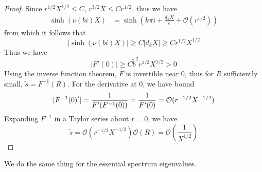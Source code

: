 \documentclass[thesis.tex]{subfiles}
\begin{document}
\begin{lemma}
\begin{proof}
Since $r^{1/2}X^{1/2} \leq C$, $r^{3/2}X \leq C r^{1/2}$, thus we have
\begin{align*} 
\sinh( \nu(bi)X) &= \sinh\left( k \pi i + \frac{d_k X}{c} + \mathcal{O}(r^{1/2}) \right)
\end{align*}
from which it follows that
\[
|\sinh( \nu(bi)X)| \geq C |d_k X| \geq C r^{1/2}X^{1/2}
\]
Thus we have
\[
|F'(0)| \geq C \tilde{b}^2 r^{1/2}X^{1/2} > 0
\]
Using the inverse function theorem, $F$ is invertible near 0, thus for $R$ sufficiently small, $\tilde{s} = F^{-1}(R)$. For the derivative at 0, we have bound
\[
|F^{-1}(0)'| = \frac{1}{F'(F^{-1}(0))} \\
= \frac{1}{F'(0)} = \mathcal{O}(r^{-1/2}X^{-1/2})
\]
Expanding $F^{-1}$ in a Taylor series about $r = 0$, we have
\[
\tilde{s} = \mathcal{O}(r^{-1/2}X^{-1/2}) \mathcal{O}(R) = \mathcal{O}\left( \frac{1}{X^{1/2}}\right)
\]
\end{proof}
\end{lemma}

We do the same thing for the essential spectrum eigenvalues.
\end{document}
